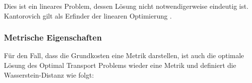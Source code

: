 \documentclass[twoside, 12pt,a4paper]{book}
\newtheorem{definition}[theorem]{Definition}
\numberwithin{equation}{section}
\begin{document}
	\noindent Dies ist ein lineares Problem, dessen Lösung nicht notwendigerweise eindeutig ist. Kantorovich gilt als Erfinder der linearen Optimierung \cite{intro_ot_thorpe}.

	
	
	\subsubsection{Metrische Eigenschaften}
	Für den Fall, dass die Grundkosten eine Metrik darstellen, ist auch die optimale Lösung des Optimal Transport Problems wieder eine Metrik \cite{cuturi2014ground} und definiert die Wasserstein-Distanz wie folgt:
	
\end{document}
